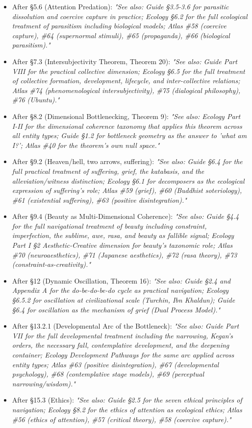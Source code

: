 \begin{itemize}[nosep,leftmargin=*]
  \item After §5.6 (Attention Predation): \textit{"See also: Guide §3.5-3.6 for parasitic dissolution and coercive capture in practice; Ecology §6.2 for the full ecological treatment of parasitism including biological models; Atlas \#58 (coercive capture), \#64 (supernormal stimuli), \#65 (propaganda), \#66 (biological parasitism)."}
  \item After §7.3 (Intersubjectivity Theorem, Theorem 20): \textit{"See also: Guide Part VIII for the practical collective dimension; Ecology §6.5 for the full treatment of collective formation, development, lifecycle, and inter-collective relations; Atlas \#74 (phenomenological intersubjectivity), \#75 (dialogical philosophy), \#76 (Ubuntu)."}
  \item After §8.2 (Dimensional Bottlenecking, Theorem 9): \textit{"See also: Ecology Part I-II for the dimensional coherence taxonomy that applies this theorem across all entity types; Guide §1.2 for bottleneck geometry as the answer to 'what am I?'; Atlas \#40 for the theorem's own null space."}
  \item After §9.2 (Heaven/hell, two arrows, suffering): \textit{"See also: Guide §6.4 for the full practical treatment of suffering, grief, the katabasis, and the alleviation/witness distinction; Ecology §6.1 for decomposers as the ecological expression of suffering's role; Atlas \#59 (grief), \#60 (Buddhist soteriology), \#61 (existential suffering), \#63 (positive disintegration)."}
  \item After §9.4 (Beauty as Multi-Dimensional Coherence): \textit{"See also: Guide §4.4 for the full navigational treatment of beauty including constraint, imperfection, the sublime, awe, rasa, and beauty as fallible signal; Ecology Part I §2 Aesthetic-Creative dimension for beauty's taxonomic role; Atlas \#70 (neuroaesthetics), \#71 (Japanese aesthetics), \#72 (rasa theory), \#73 (constraint-as-creativity)."}
  \item After §12 (Dynamic Oscillation, Theorem 16): \textit{"See also: Guide §2.4 and Appendix A for the do-be-do-be-do cycle as practical navigation; Ecology §6.5.2 for oscillation at civilizational scale (Turchin, Ibn Khaldun); Guide §6.4 for oscillation as the mechanism of grief (Dual Process Model)."}
  \item After §13.2.1 (Developmental Arc of the Bottleneck): \textit{"See also: Guide Part VII for the full developmental treatment including the narrowing, Kegan's orders, the necessary fall, contemplative development, and the deepening container; Ecology Development Pathways for the same arc applied across entity types; Atlas \#63 (positive disintegration), \#67 (developmental psychology), \#68 (contemplative stage models), \#69 (perceptual narrowing/wisdom)."}
  \item After §15.3 (Ethics): \textit{"See also: Guide §2.5 for the seven ethical principles of navigation; Ecology §8.2 for the ethics of attention as ecological ethics; Atlas \#56 (ethics of attention), \#57 (critical theory), \#58 (coercive capture)."}
\end{itemize}


